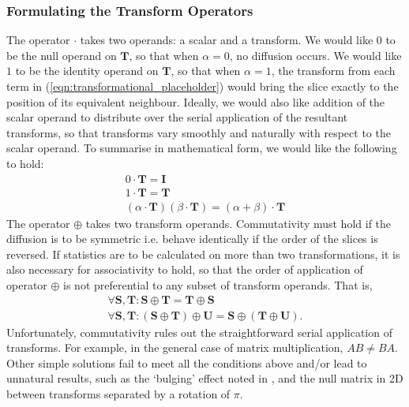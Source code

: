     \subsubsection{Formulating the Transform Operators} %
    \label{ssub:formulating_the_transform_operators}
		The operator $\cdot$ takes two operands: a scalar and a transform. We would like $0$ to be the null operand on $\mathbf{T}$, so that when $\alpha = 0$, no diffusion occurs. We would like $1$ to be the identity operand on $\mathbf{T}$, so that when $\alpha = 1$, the transform from each term in (\ref{eqn:transformational_placeholder}) would bring the slice exactly to the position of its equivalent neighbour. Ideally, we would also like addition of the scalar operand to distribute over the serial application of the resultant transforms, so that transforms vary smoothly and naturally with respect to the scalar operand. To summarise in mathematical form, we would like the following to hold:
		\begin{gather}
			0 \cdot \mathbf{T} = \mathbf{I} \label{eqn:null} \\
			1 \cdot \mathbf{T} = \mathbf{T} \label{eqn:identity} \\
			(\alpha \cdot \mathbf{T}) (\beta \cdot \mathbf{T}) = (\alpha + \beta) \cdot \mathbf{T} \label{eqn:distributivity}
		\end{gather}
	  The operator $\oplus$ takes two transform operands. Commutativity must hold if the diffusion is to be symmetric i.e. behave identically if the order of the slices is reversed. If statistics are to be calculated on more than two transformations, it is also necessary for associativity to hold, so that the order of application of operator $\oplus$ is not preferential to any subset of transform operands. That is,
    \begin{gather}
      \forall \mathbf{S}, \mathbf{T} : \mathbf{S} \oplus \mathbf{T} = \mathbf{T} \oplus \mathbf{S} \label{eqn:commutativity} \\
      \forall \mathbf{S}, \mathbf{T} : (\mathbf{S} \oplus \mathbf{T}) \oplus \mathbf{U} = \mathbf{S} \oplus (\mathbf{T} \oplus \mathbf{U}). \label{eqn:associativity}
    \end{gather}
		Unfortunately, commutativity rules out the straightforward serial application of transforms. For example, in the general case of matrix multiplication, $AB \ne BA$. Other simple solutions fail to meet all the conditions above and/or lead to unnatural results, such as the `bulging' effect noted in \cite{Arsigny2005}, and the null matrix in 2D between transforms separated by a rotation of $\pi$.
        
